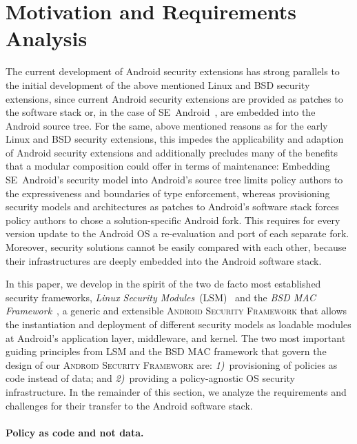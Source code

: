 \documentclass[letterpaper,twocolumn,10pt]{article}
\newcommand{\OURNAME}{\textsc{Android Security Framework}\xspace}
\begin{document}
\section{Motivation and Requirements Analysis}
\label{sec:requirements}
The current development of Android security extensions has strong parallels to the initial development of the above mentioned Linux and BSD security extensions, since current Android security extensions are provided as patches to the software stack or, in the case of SE~Android~\cite{Smalley2013}, are embedded into the Android source tree. For the same, above mentioned reasons as for the early Linux and BSD security extensions, this impedes the applicability and adaption of Android security extensions and additionally precludes many of the benefits that a modular composition could offer in terms of maintenance: Embedding SE~Android's security model into Android's source tree limits policy authors to the expressiveness and boundaries of type enforcement, whereas provisioning security models and architectures as patches to Android's software stack forces policy authors to chose a solution-specific Android fork. This requires for every version update to the Android OS a re-evaluation and port of each separate fork. Moreover, security solutions cannot be easily compared with each other, because their infrastructures are deeply embedded into the Android software stack.

In this paper, we develop in the spirit of the two de facto most established security frameworks, \textit{Linux Security Modules}~(LSM)~\cite{SELinux01} and the \textit{BSD MAC Framework}~\cite{conf/usenix/WatsonMVF03,UCAM-CL-TR-818}, a generic and extensible \OURNAME that allows the instantiation and deployment of different security models as loadable modules at Android's application layer, middleware, and kernel. The two most important guiding principles from LSM and the BSD MAC framework that govern the design of our \OURNAME are: \textit{1)}~provisioning of policies as code instead of data; and \textit{2)}~providing a policy-agnostic OS security infrastructure. In the remainder of this section, we analyze the requirements and challenges for their transfer to the Android software stack.


\paragraph{Policy as code and not data.}
\end{document}
